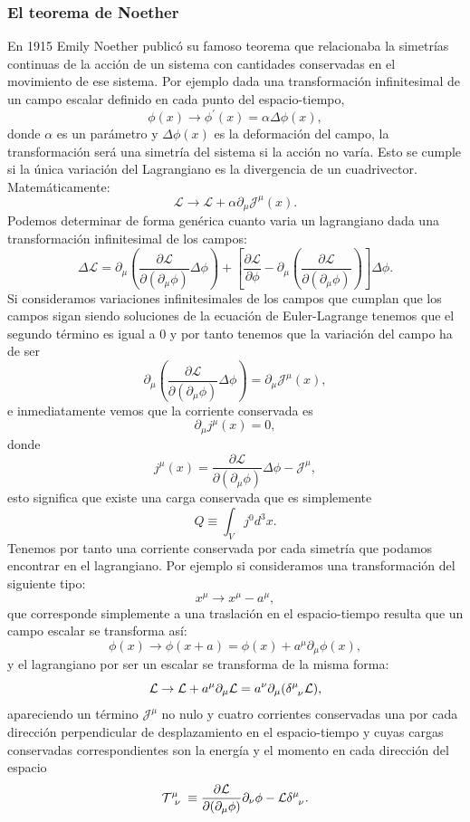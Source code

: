 \documentclass{article}
\theoremstyle{plain}
\theoremstyle{definition}
\begin{document}
	\subsubsection{El teorema de Noether}
	En 1915 Emily Noether publicó su famoso teorema que relacionaba la simetrías continuas de la acción de un sistema con cantidades conservadas en el movimiento de ese sistema. Por ejemplo dada una transformación infinitesimal de un campo escalar definido en cada punto del espacio-tiempo,
	\[\phi(x)\rightarrow\phi^{\prime}(x)= \alpha\Delta\phi(x),\]
	donde \(\alpha\) es un parámetro y \(\Delta \phi(x)\) es la deformación del campo, la transformación será una simetría del sistema si la acción no varía. Esto se cumple si la única variación del Lagrangiano es la divergencia de un cuadrivector. Matemáticamente: \[\mathcal{L} \rightarrow \mathcal{L} + \alpha\partial_{\mu}\mathcal{J}^{\mu}(x)\text{.}\]
	Podemos determinar de forma genérica cuanto varia un lagrangiano dada una transformación infinitesimal de los campos: \[\Delta\mathcal{L} = \partial_{\mu}\left(\frac{\partial\mathcal{L}}{\partial(\partial_{\mu}\phi)}\Delta\phi\right) + \left[\frac{\partial\mathcal{L}}{\partial\phi} - \partial_{\mu}\left(\frac{\partial\mathcal{L}}{\partial(\partial_{\mu}\phi)}\right)\right] \Delta\phi \text{.} \] Si consideramos variaciones infinitesimales de los campos que cumplan que los campos sigan siendo soluciones de la ecuación de Euler-Lagrange tenemos que el segundo término es igual a 0 y por tanto tenemos que la variación del campo ha de ser \[\partial_{\mu}\left(\frac{\partial\mathcal{L}}{\partial(\partial_{\mu}\phi)}\Delta\phi\right) = \partial_{\mu}\mathcal{J}^{\mu}(x),\] e inmediatamente vemos que la corriente conservada es
	\[\partial_{\mu} j^{\mu}(x) = 0, \] donde \[j^{\mu}(x) = \frac{\partial\mathcal{L}}{\partial(\partial_{\mu}\phi)}\Delta\phi - \mathcal{J}^{\mu}, \] esto significa que existe una carga conservada que es simplemente \[Q \equiv \int_{V}j^0d^ 3x\text{.} \]
	Tenemos por tanto una corriente conservada por cada simetría que podamos encontrar en el lagrangiano. Por ejemplo si consideramos una transformación del siguiente tipo: \[x^{\mu} \rightarrow x^{\mu} - a^{\mu}, \] que corresponde simplemente a una traslación en el espacio-tiempo resulta que un campo escalar se transforma así: \[\phi(x) \rightarrow\phi(x+a) = \phi(x) +a^{\mu}\partial_{\mu}\phi(x),  \]
	y el lagrangiano  por ser un escalar se transforma de la misma forma: \[\mathcal{L}\rightarrow \mathcal{L} + a^{\mu}\partial_{\mu}\mathcal{L} = a^{\nu}\partial_{\mu}(\tensor{\delta}{^{\mu}_\nu}\mathcal{L} ),  \]
	apareciendo un término \(\mathcal{J}^{\mu}\) no nulo y cuatro corrientes conservadas una por cada dirección perpendicular de desplazamiento en el espacio-tiempo y cuyas cargas conservadas correspondientes son la energía y el momento en cada dirección del espacio
	\[\tensor{\mathcal{T}}{^{\mu}_\nu} \equiv \frac{\partial\mathcal{L}}{\partial(\partial_{\mu}\phi)}\partial_{\nu}\phi-\mathcal{L}\tensor{\delta}{^{\mu}_\nu}\text{.} \]
\end{document}
